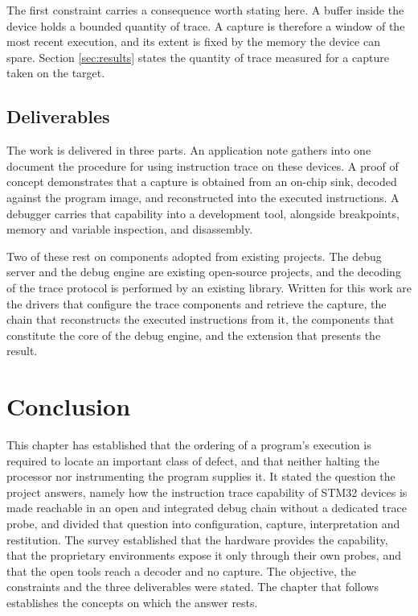 The first constraint carries a consequence worth stating here. A buffer inside the device holds a bounded quantity of trace. A capture is therefore a window of the most recent execution, and its extent is fixed by the memory the device can spare. Section \ref{sec:results} states the quantity of trace measured for a capture taken on the target.

\subsection{Deliverables}

The work is delivered in three parts. An application note gathers into one document the procedure for using instruction trace on these devices. A proof of concept demonstrates that a capture is obtained from an on-chip sink, decoded against the program image, and reconstructed into the executed instructions. A debugger carries that capability into a development tool, alongside breakpoints, memory and variable inspection, and disassembly.

Two of these rest on components adopted from existing projects. The debug server and the debug engine are existing open-source projects, and the decoding of the trace protocol is performed by an existing library. Written for this work are the drivers that configure the trace components and retrieve the capture, the chain that reconstructs the executed instructions from it, the components that constitute the core of the debug engine, and the extension that presents the result.

\section{Conclusion}

This chapter has established that the ordering of a program's execution is required to locate an important class of defect, and that neither halting the processor nor instrumenting the program supplies it. It stated the question the project answers, namely how the instruction trace capability of STM32 devices is made reachable in an open and integrated debug chain without a dedicated trace probe, and divided that question into configuration, capture, interpretation and restitution. The survey established that the hardware provides the capability, that the proprietary environments expose it only through their own probes, and that the open tools reach a decoder and no capture. The objective, the constraints and the three deliverables were stated. The chapter that follows establishes the concepts on which the answer rests.
